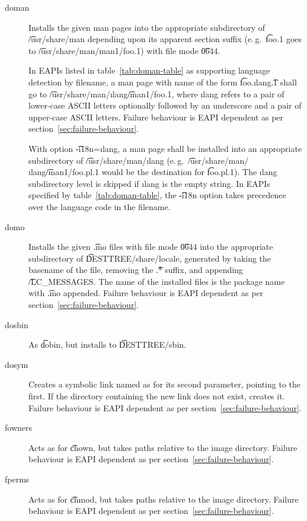 \begin{description}
\item[doman] Installs the given man pages into the appropriate subdirectory of \t{/usr/share/man}
    depending upon its apparent section suffix (e.\,g.\ \t{foo.1} goes to
    \t{/usr/share/man/man1/foo.1}) with file mode \t{0644}.

     In EAPIs listed in table~\ref{tab:doman-table} as supporting
    language detection by filename, a man page with name of the form \t{foo.}\i{lang}\t{.1} shall
    go to \t{/usr/share/man/}\i{lang}\t{/man1/foo.1}, where \i{lang} refers to a pair of lower-case
    ASCII letters optionally followed by an underscore and a pair of upper-case ASCII letters.
    Failure behaviour is EAPI dependent as per section~\ref{sec:failure-behaviour}.

    With option \t{-i18n=}\i{lang}, a man page shall be installed into an appropriate subdirectory
    of \t{/usr/share/man/}\i{lang} (e.\,g.\ \t{/usr/share/man/}\i{lang}\t{/man1/foo.pl.1} would be
    the destination for \t{foo.pl.1}). The \i{lang} subdirectory level is skipped if \i{lang} is
    the empty string. In EAPIs specified by table~\ref{tab:doman-table}, the \t{-i18n} option takes
    precedence over the language code in the filename.

\item[domo] Installs the given \t{.mo} files with file mode \t{0644} into the appropriate
    subdirectory of \t{DESTTREE\slash share\slash locale}, generated by taking the basename of the
    file, removing the \t{.*} suffix, and appending \t{/LC\_MESSAGES}\@. The name of the installed
    files is the package name with \t{.mo} appended. Failure behaviour is EAPI dependent as per
    section~\ref{sec:failure-behaviour}.

\item[dosbin] As \t{dobin}, but installs to \t{DESTTREE/sbin}.

\item[dosym] Creates a symbolic link named as for its second parameter, pointing to the first. If
    the directory containing the new link does not exist, creates it. Failure behaviour is EAPI
    dependent as per section~\ref{sec:failure-behaviour}.

\item[fowners] Acts as for \t{chown}, but takes paths relative to the image directory. Failure
    behaviour is EAPI dependent as per section~\ref{sec:failure-behaviour}.

\item[fperms] Acts as for \t{chmod}, but takes paths relative to the image directory. Failure
    behaviour is EAPI dependent as per section~\ref{sec:failure-behaviour}.


\end{description}

